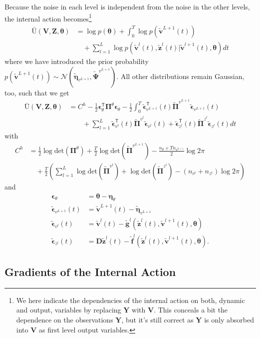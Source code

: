 \documentclass[a4paper,10pt]{article}
\newcommand{\bs}[1]{\mathbf{#1}}					%
\newcommand{\bgs}[1]{\boldsymbol{#1}}				%
\newcommand{\tr}{\mathsf{T}}				%
\newcommand{\gc}[1]{\tilde{#1}} %
\renewcommand{\ss}{z}         %
\newcommand{\sv}{v}         %
\newcommand{\spe}{\epsilon} %
\renewcommand{\sp}{\theta}    %
\newcommand{\ps}{\bs{\ss}}    %
\newcommand{\pv}{\bs{\sv}}    %
\newcommand{\ppe}{\bgs{\spe}} %
\newcommand{\psg}{\gc{\ps}}    %
\newcommand{\pvg}{\gc{\pv}}    %
\newcommand{\ppeg}{\gc{\ppe}} %
\newcommand{\pp}{\bgs{\sp}} %
\newcommand{\Ps}{\bs{Z}}    %
\newcommand{\Po}{\bs{Y}}    %
\newcommand{\Pv}{\bs{V}}    %
\newcommand{\D}{\bs{D}}				%
\newcommand{\Ua}{\bar{\mathrm{U}}}		%
\newcommand{\N}{\mathcal{N}}			%
\newcommand{\Prec}{\bgs{\Pi}}			%
\renewcommand{\det}[1]{\mathrm{det}(#1)}	%
\begin{document}
Because the noise in each level is independent from the noise in the other levels, the internal action becomes\footnote{We here indicate the dependencies of the internal action on both, dynamic and output, variables by replacing $\Po$ with $\Pv$. This conceals a bit the dependence on the observations $\Po$, but it's still correct as $\Po$ is only absorbed into $\Pv$ as first level output variables.}
\begin{align}
    \Ua(\Pv,\Ps,\pp) &= \log p(\pp) + \int_0^T \log p(\pvg^{L+1}(t))\nonumber\\
    &\quad + \sum_{l=1}^L \log p(\pvg^{l}(t),\psg^l(t)|\pvg^{l+1}(t),\pp)dt
\end{align}
where we have introduced the prior probability $p(\pvg^{L+1}(t)) \sim \N(\gc{\bgs{\eta}}_{\sv^{L+1}},\gc{\bgs{\Psi}}^{\sv^{L+1}})$. All other distributions remain Gaussian, too, such that we get
\begin{align}\label{eq:intActionHier}
    \Ua(\Pv,\Ps,\pp) &= C^h  - \frac{1}{2}\ppe_\sp^\tr\Prec^{\sp}\ppe_\sp - \frac{1}{2}\int_0^T \ppeg_{\sv^{L+1}}^\tr(t)\gc{\Prec}^{\sv^{L+1}}\ppeg_{\sv^{L+1}}(t)\nonumber\\
    &\qquad + \sum_{l=1}^L \ppeg_{\sv^l}^\tr(t)\gc{\Prec}^{\sv^l}\ppeg_{\sv^l}(t) + \ppeg_{\ss^l}^\tr(t)\gc{\Prec}^{\ss^l}\ppeg_{\ss^l}(t)  dt
\end{align}
with
\begin{align}
    C^h &= \frac{1}{2}\log\det{\Prec^{\sp}} + \frac{T}{2}\log\det{\gc{\Prec}^{\sv^{L+1}}} - \frac{n_\sp + Tn_{\sv^{L+1}}}{2}\log 2\pi\nonumber\\
    &\quad + \frac{T}{2} \left( \sum_{l=1}^L \log\det{\gc{\Prec}^{\sv^l}} + \log\det{\gc{\Prec}^{\ss^l}} - (n_{\sv^l} + n_{\ss^l})\log 2\pi \right)
\end{align}
and
\begin{align}
    \ppe_\sp &= \pp - \bgs{\eta}_\sp\\
    \ppeg_{\sv^{L+1}}(t) &= \pvg^{L+1}(t) - \gc{\bgs{\eta}}_{\sv^{L+1}}\\
    \ppeg_{\sv^l}(t) &= \pvg^l(t) - \gc{\bs{g}}^l(\psg^l(t),\pvg^{l+1}(t),\pp)\\
    \ppeg_{\ss^l}(t) &= \D\psg^l(t) - \gc{\bs{f}}^l(\psg^l(t),\pvg^{l+1}(t),\pp).
\end{align}


\subsection{Gradients of the Internal Action}
\end{document}
